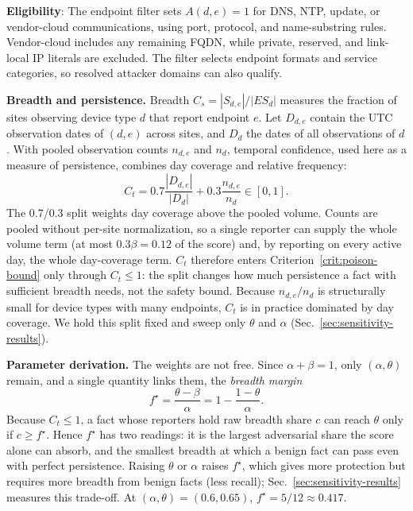 \documentclass[journal]{IEEEtran}
\theoremstyle{definition}
\begin{document}
\textbf{Eligibility}: The endpoint filter sets $A(d,e)=1$ for DNS, NTP, update, or vendor-cloud communications, using port, protocol, and name-substring rules. Vendor-cloud includes any remaining FQDN, while private, reserved, and link-local IP literals are excluded. The filter selects endpoint formats and service categories, so resolved attacker domains can also qualify.

\textbf{Breadth and persistence.} Breadth $C_s=|S_{d,e}|/|ES_d|$ measures the fraction of sites observing device type $d$ that report endpoint $e$. Let $D_{d,e}$ contain the UTC observation dates of $(d,e)$ across sites, and $D_d$ the dates of all observations of $d$. With pooled observation counts $n_{d,e}$ and $n_d$, temporal confidence, used here as a measure of persistence, combines day coverage and relative frequency:
\begin{equation}
C_t=0.7\frac{|D_{d,e}|}{|D_d|}+0.3\frac{n_{d,e}}{n_d}\in[0,1].
\label{eq:ct}
\end{equation}
The 0.7/0.3 split weights day coverage above the pooled volume. Counts are pooled without per-site normalization, so a single reporter can supply the whole volume term (at most $0.3\beta=0.12$ of the score) and, by reporting on every active day, the whole day-coverage term. $C_t$ therefore enters Criterion~\ref{crit:poison-bound} only through $C_t\le1$: the split changes how much persistence a fact with sufficient breadth needs, not the safety bound. Because $n_{d,e}/n_d$ is structurally small for device types with many endpoints, $C_t$ is in practice dominated by day coverage. We hold this split fixed and sweep only $\theta$ and $\alpha$ (Sec.~\ref{sec:sensitivity-results}).

\textbf{Parameter derivation.} The weights are not free. Since $\alpha+\beta=1$, only $(\alpha,\theta)$ remain, and a single quantity links them, the \emph{breadth margin}
\begin{equation}
f^\star=\frac{\theta-\beta}{\alpha}=1-\frac{1-\theta}{\alpha}.
\label{eq:fstar}
\end{equation}
Because $C_t\le1$, a fact whose reporters hold raw breadth share $c$ can reach $\theta$ only if $c\ge f^\star$. Hence $f^\star$ has two readings: it is the largest adversarial share the score alone can absorb, and the smallest breadth at which a benign fact can pass even with perfect persistence. Raising $\theta$ or $\alpha$ raises $f^\star$, which gives more protection but requires more breadth from benign facts (less recall); Sec.~\ref{sec:sensitivity-results} measures this trade-off. At $(\alpha,\theta)=(0.6,0.65)$, $f^\star=5/12\approx0.417$.
\end{document}
